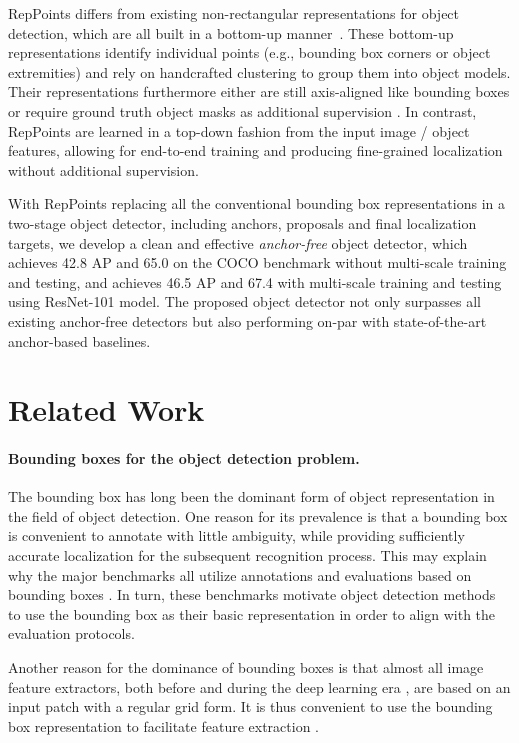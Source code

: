\documentclass[10pt,twocolumn,letterpaper]{article}
\begin{document}
RepPoints differs from existing non-rectangular representations for object detection, which are all built in a bottom-up manner~\cite{Denet,CornerNet,ExtremeNet}. These bottom-up representations identify individual points (e.g., bounding box corners or object extremities) and rely on handcrafted clustering to group them into object models. Their representations furthermore either are still axis-aligned like bounding boxes \cite{Denet,CornerNet} or require ground truth object masks as additional supervision \cite{ExtremeNet}. In contrast, RepPoints are learned in a top-down fashion from the input image / object features, allowing for end-to-end training and producing fine-grained localization without additional supervision. 

With RepPoints replacing all the conventional bounding box representations in a two-stage object detector, including anchors, proposals and final localization targets, we develop a clean and effective \emph{anchor-free} object detector, which achieves 42.8 AP and 65.0  on the COCO benchmark \cite{MSCOCO} without multi-scale training and testing, and achieves 46.5 AP and 67.4  with multi-scale training and testing using ResNet-101 model. The proposed object detector not only surpasses all existing anchor-free detectors but also performing on-par with state-of-the-art anchor-based baselines.

 \section{Related Work}
\label{sec::related-work}
\paragraph{Bounding boxes for the object detection problem.}
The bounding box has long been the dominant form of object representation in the field of object detection. One reason for its prevalence is that a bounding box is convenient to annotate with little ambiguity, while providing sufficiently accurate localization for the subsequent recognition process. This may explain why the major benchmarks all utilize annotations and evaluations based on bounding boxes \cite{PascalVOC,MSCOCO,OpenImagesV4}. In turn, these benchmarks motivate object detection methods to use the bounding box as their basic representation in order to align with the evaluation protocols.

Another reason for the dominance of bounding boxes is that almost all image feature extractors, both before \cite{Haar,HOG} and during the deep learning era \cite{AlexNet,VGG,GoogLeNet,ResNet}, are based on an input patch with a regular grid form. It is thus convenient to use the bounding box representation to facilitate feature extraction \cite{girshick2014rich,girshick2015fast,ren2015faster}.
\end{document}
